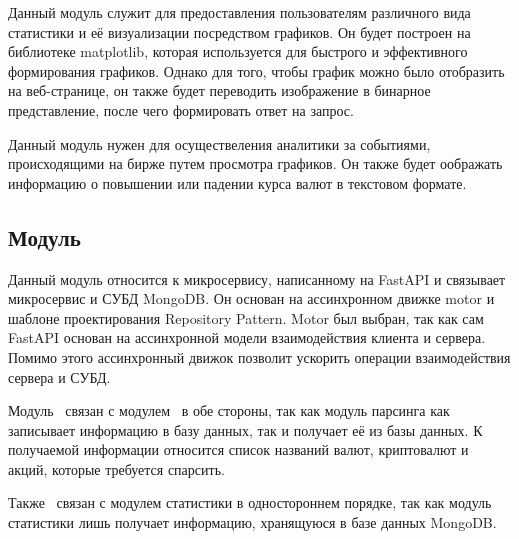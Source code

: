 Данный модуль служит для предоставления пользователям различного вида статистики и её визуализации посредством графиков.
Он будет построен на библиотеке matplotlib, которая используется для быстрого и эффективного формирования графиков.
Однако для того, чтобы график можно было отобразить на веб-странице, он также будет переводить изображение в бинарное представление,
после чего формировать ответ на запрос.

Данный модуль нужен для осуществеления аналитики за событиями, происходящими на бирже путем просмотра графиков.
Он также будет оображать информацию о повышении или падении курса валют в текстовом формате.

\subsection{Модуль \moduleCommunicationMongoDB}
Данный модуль относится к микросервису, написанному на FastAPI и связывает микросервис и СУБД MongoDB.
Он основан на ассинхронном движке motor и шаблоне проектирования Repository Pattern.
Motor был выбран, так как сам FastAPI основан на ассинхронной модели взаимодействия клиента и сервера.
Помимо этого ассинхронный движок позволит ускорить операции взаимодействия сервера и СУБД.

Модуль \moduleCommunicationMongoDB ~связан с модулем \moduleParsing ~в обе стороны, так как модуль парсинга как записывает информацию в базу данных, так и получает её из базы данных.
К получаемой информации относится список названий валют, криптовалют и акций, которые требуется спарсить.

Также \moduleCommunicationMongoDB ~связан с модулем статистики в одностороннем порядке, так как модуль статистики лишь получает информацию, хранящуюся в базе данных MongoDB.

